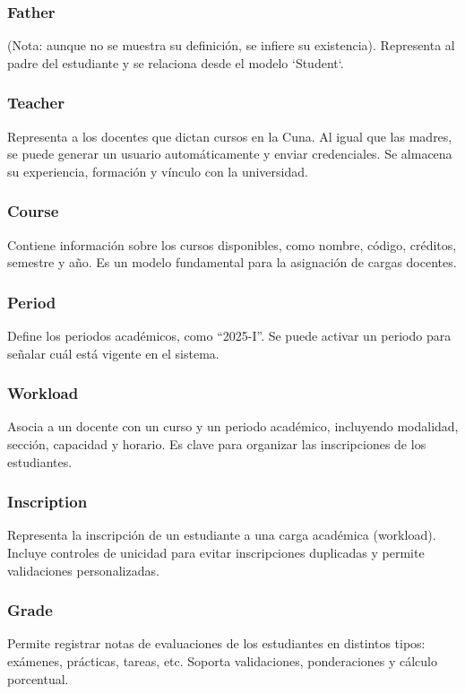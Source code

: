 \documentclass{article}
\begin{document}
        \subsubsection{Father}
        (Nota: aunque no se muestra su definición, se infiere su existencia). Representa al padre del estudiante y se relaciona desde el modelo `Student`.

        \subsubsection{Teacher}
        Representa a los docentes que dictan cursos en la Cuna. Al igual que las madres, se puede generar un usuario automáticamente y enviar credenciales. Se almacena su experiencia, formación y vínculo con la universidad.

        \subsubsection{Course}
        Contiene información sobre los cursos disponibles, como nombre, código, créditos, semestre y año. Es un modelo fundamental para la asignación de cargas docentes.

        \subsubsection{Period}
        Define los periodos académicos, como “2025-I”. Se puede activar un periodo para señalar cuál está vigente en el sistema.

        \subsubsection{Workload}
        Asocia a un docente con un curso y un periodo académico, incluyendo modalidad, sección, capacidad y horario. Es clave para organizar las inscripciones de los estudiantes.

        \subsubsection{Inscription}
        Representa la inscripción de un estudiante a una carga académica (workload). Incluye controles de unicidad para evitar inscripciones duplicadas y permite validaciones personalizadas.

        \subsubsection{Grade}
        Permite registrar notas de evaluaciones de los estudiantes en distintos tipos: exámenes, prácticas, tareas, etc. Soporta validaciones, ponderaciones y cálculo porcentual.
\end{document}
